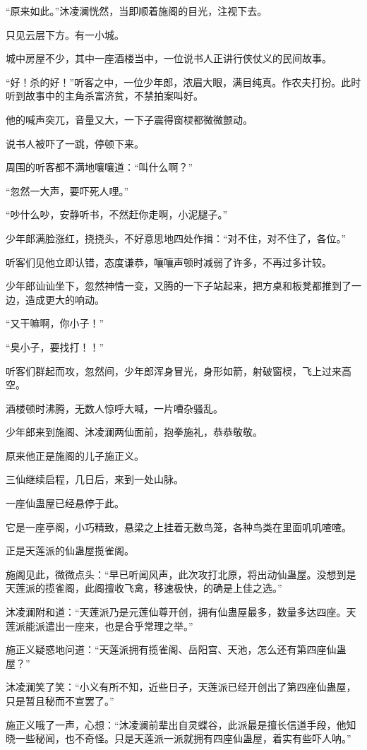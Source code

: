 \begin{this_body}
“原来如此。”沐凌澜恍然，当即顺着施阁的目光，注视下去。

只见云层下方。有一小城。

城中房屋不少，其中一座酒楼当中，一位说书人正讲行侠仗义的民间故事。

“好！杀的好！”听客之中，一位少年郎，浓眉大眼，满目纯真。作农夫打扮。此时听到故事中的主角杀富济贫，不禁拍案叫好。

他的喊声突兀，音量又大，一下子震得窗棂都微微颤动。

说书人被吓了一跳，停顿下来。

周围的听客都不满地嚷嚷道：“叫什么啊？”

“忽然一大声，要吓死人哩。”

“吵什么吵，安静听书，不然赶你走啊，小泥腿子。”

少年郎满脸涨红，挠挠头，不好意思地四处作揖：“对不住，对不住了，各位。”

听客们见他立即认错，态度谦恭，嚷嚷声顿时减弱了许多，不再过多计较。

少年郎讪讪坐下，忽然神情一变，又腾的一下子站起来，把方桌和板凳都推到了一边，造成更大的响动。

“又干嘛啊，你小子！”

“臭小子，要找打！！”

听客们群起而攻，忽然间，少年郎浑身冒光，身形如箭，射破窗棂，飞上过来高空。

酒楼顿时沸腾，无数人惊呼大喊，一片嘈杂骚乱。

少年郎来到施阁、沐凌澜两仙面前，抱拳施礼，恭恭敬敬。

原来他正是施阁的儿子施正义。

三仙继续启程，几日后，来到一处山脉。

一座仙蛊屋已经悬停于此。

它是一座亭阁，小巧精致，悬梁之上挂着无数鸟笼，各种鸟类在里面叽叽喳喳。

正是天莲派的仙蛊屋揽雀阁。

施阁见此，微微点头：“早已听闻风声，此次攻打北原，将出动仙蛊屋。没想到是天莲派的揽雀阁，此阁擅收飞禽，移速极快，的确是上佳之选。”

沐凌澜附和道：“天莲派乃是元莲仙尊开创，拥有仙蛊屋最多，数量多达四座。天莲派能派遣出一座来，也是合乎常理之举。”

施正义疑惑地问道：“天莲派拥有揽雀阁、岳阳宫、天池，怎么还有第四座仙蛊屋？”

沐凌澜笑了笑：“小义有所不知，近些日子，天莲派已经开创出了第四座仙蛊屋，只是暂且秘而不宣罢了。”

施正义哦了一声，心想：“沐凌澜前辈出自灵蝶谷，此派最是擅长信道手段，他知晓一些秘闻，也不奇怪。只是天莲派一派就拥有四座仙蛊屋，着实有些吓人呐。”


\end{this_body}
